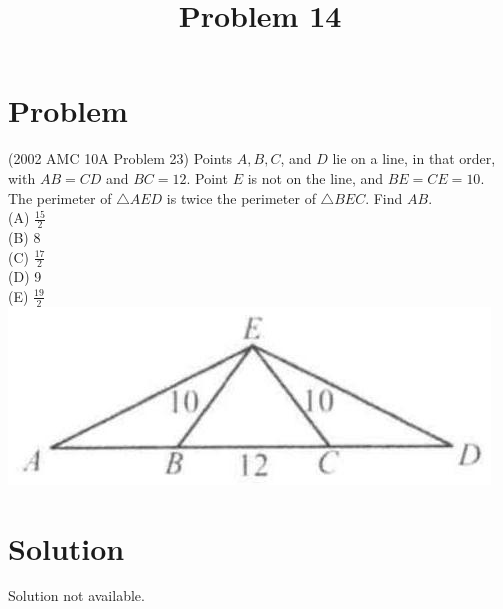 \documentclass{article}
\title{Problem 14}
\date{}
\begin{document}
\maketitle

\section*{Problem}
(2002 AMC 10A Problem 23) Points \(A, B, C\), and \(D\) lie on a line, in that order, with \(A B=C D\) and \(B C=12\). Point \(E\) is not on the line, and \(B E=C E=10\). The perimeter of \(\triangle A E D\) is twice the perimeter of \(\triangle B E C\). Find \(A B\).\\
(A) \(\frac{15}{2}\)\\
(B) 8\\
(C) \(\frac{17}{2}\)\\
(D) 9\\
(E) \(\frac{19}{2}\)\\
\centering
\includegraphics[width=\textwidth]{images/090(3).jpg}

\section*{Solution}
Solution not available.
\end{document}
